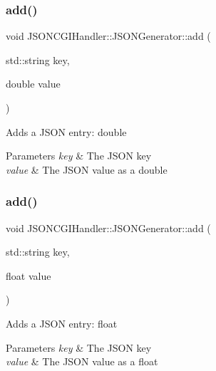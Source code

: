 \subsubsection{\texorpdfstring{add()}{add()}\hspace{0.1cm}{\footnotesize\ttfamily [2/5]}}
{\footnotesize\ttfamily void J\+S\+O\+N\+C\+G\+I\+Handler\+::\+J\+S\+O\+N\+Generator\+::add (\begin{DoxyParamCaption}\item[{std\+::string}]{key,  }\item[{double}]{value }\end{DoxyParamCaption})\hspace{0.3cm}{\ttfamily [inline]}}

Adds a J\+S\+ON entry\+: double 
\begin{DoxyParams}{Parameters}
{\em key} & The J\+S\+ON key \\
\hline
{\em value} & The J\+S\+ON value as a double \\
\hline
\end{DoxyParams}
\mbox{\label{classJSONCGIHandler_1_1JSONGenerator_a2192849b22341653a138bb63da6c6c9a}} 
\subsubsection{\texorpdfstring{add()}{add()}\hspace{0.1cm}{\footnotesize\ttfamily [3/5]}}
{\footnotesize\ttfamily void J\+S\+O\+N\+C\+G\+I\+Handler\+::\+J\+S\+O\+N\+Generator\+::add (\begin{DoxyParamCaption}\item[{std\+::string}]{key,  }\item[{float}]{value }\end{DoxyParamCaption})\hspace{0.3cm}{\ttfamily [inline]}}

Adds a J\+S\+ON entry\+: float 
\begin{DoxyParams}{Parameters}
{\em key} & The J\+S\+ON key \\
\hline
{\em value} & The J\+S\+ON value as a float \\
\hline
\end{DoxyParams}
\mbox{\label{classJSONCGIHandler_1_1JSONGenerator_afc3e9374b0e49ca1f701bd22bbd4cd92}} 
